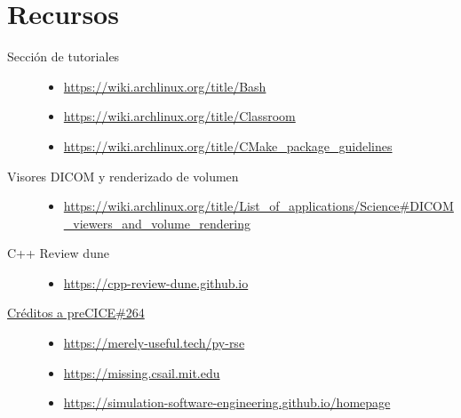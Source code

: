 \documentclass[9pt,a3paper]{scrartcl}
\begin{document}
\section*{\Huge Recursos}

\begin{description}
	\item[Sección de tutoriales]
		\leavevmode

		\begin{itemize}
			\item
			      \url{https://wiki.archlinux.org/title/Bash}

			\item

			      \url{https://wiki.archlinux.org/title/Classroom}

			\item

			      \url{https://wiki.archlinux.org/title/CMake_package_guidelines}
		\end{itemize}


	\item[Visores DICOM y renderizado de volumen]
		\leavevmode
		\begin{itemize}
			\item
			      \url{https://wiki.archlinux.org/title/List_of_applications/Science#DICOM_viewers_and_volume_rendering}
		\end{itemize}

	\item[C++ Review dune]
		\leavevmode
		\begin{itemize}
			\item

			      \url{https://cpp-review-dune.github.io}
		\end{itemize}


	\item[\href{https://github.com/precice/tutorials/pull/264/files}{Créditos a preCICE\#264}]
		\leavevmode
		\begin{itemize}
			\item

			      \url{https://merely-useful.tech/py-rse}
			\item

			      \url{https://missing.csail.mit.edu}
			\item

			      \url{https://simulation-software-engineering.github.io/homepage}
		\end{itemize}

\end{description}
\end{document}
